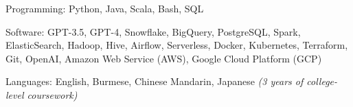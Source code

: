 

\begin{cvskills}

  \cvskill
  {Programming:} %
  {Python, Java, Scala, Bash, SQL}

  \cvskill
  {Software:} %
  {GPT-3.5, GPT-4, Snowflake, BigQuery, PostgreSQL, Spark, ElasticSearch, Hadoop, Hive, Airflow, Serverless, Docker, Kubernetes, Terraform, Git, OpenAI, Amazon Web Service (AWS), Google Cloud Platform (GCP)} %

  \cvskill
  {Languages:} %
  {English, Burmese, Chinese Mandarin, Japanese \bodyfontlight\emph{(3 years of college-level coursework)}} %

\end{cvskills}
